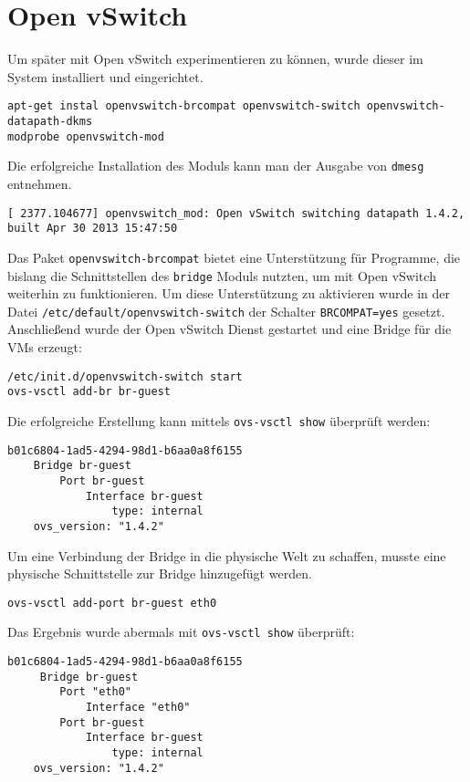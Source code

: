 \chapter{Open vSwitch}
\label{chap:ovs}
Um später mit Open vSwitch experimentieren zu können, wurde dieser im System installiert und eingerichtet.
\begin{verbatim}
apt-get instal openvswitch-brcompat openvswitch-switch openvswitch-datapath-dkms
modprobe openvswitch-mod
\end{verbatim} 
Die erfolgreiche Installation des Moduls kann man der Ausgabe von \verb#dmesg# entnehmen.
\setupVerbatimOut
\begin{verbatim}
[ 2377.104677] openvswitch_mod: Open vSwitch switching datapath 1.4.2, built Apr 30 2013 15:47:50
\end{verbatim}
Das Paket \verb#openvswitch-brcompat# bietet eine Unterstützung für Programme, die bislang die Schnittstellen des \verb#bridge# Moduls nutzten, um mit Open vSwitch weiterhin zu funktionieren. 
Um diese Unterstützung zu aktivieren wurde in der Datei \verb#/etc/default/openvswitch-switch# der Schalter \verb#BRCOMPAT=yes# gesetzt. Anschließend wurde der Open vSwitch Dienst gestartet und eine Bridge für die VMs erzeugt:
\setupVerbatimBash
\begin{verbatim}
/etc/init.d/openvswitch-switch start
ovs-vsctl add-br br-guest
\end{verbatim}
Die erfolgreiche Erstellung kann mittels \verb#ovs-vsctl show# überprüft werden:
\setupVerbatimOut
\begin{verbatim}
b01c6804-1ad5-4294-98d1-b6aa0a8f6155
    Bridge br-guest
        Port br-guest
            Interface br-guest
                type: internal
    ovs_version: "1.4.2"
\end{verbatim} 
Um eine Verbindung der Bridge in die physische Welt zu schaffen, musste eine physische Schnittstelle zur Bridge hinzugefügt werden.
\setupVerbatimBash
\begin{verbatim}
ovs-vsctl add-port br-guest eth0
\end{verbatim}
Das Ergebnis wurde abermals mit \verb#ovs-vsctl show# überprüft:
\setupVerbatimOut
\begin{verbatim}
b01c6804-1ad5-4294-98d1-b6aa0a8f6155
     Bridge br-guest
        Port "eth0"
            Interface "eth0"
        Port br-guest
            Interface br-guest
                type: internal
    ovs_version: "1.4.2"
\end{verbatim}

